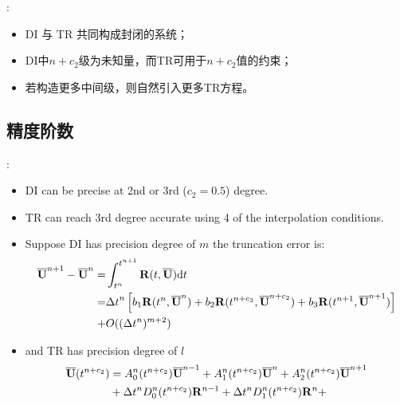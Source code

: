 \documentclass[aspectratio=169,serif]{beamer} %
\begin{document}
\begin{frame}[allowframebreaks]{\secname: \subsecname}
  \begin{itemize}
    \item DI  与 TR  共同构成封闭的系统；
    \item DI中$n+c_2$级为未知量，而TR可用于$n+c_2$值的约束；
    \item 若构造更多中间级，则自然引入更多TR方程。
  \end{itemize}
\end{frame}

\subsection{精度阶数}

\begin{frame}[allowframebreaks]{\secname: \subsecname}
  \begin{itemize}
    \item DI  can be precise at 2nd or 3rd ($c_2=0.5$) degree.
    \item TR can reach 3rd degree accurate using 4 of the interpolation conditions.
    \item Suppose DI has precision degree of $m$ the truncation error is:
          \begin{equation}
            \label{eq:Quad3Err}
            \begin{aligned}
              \overline{\mathbf{U}}^{n+1} - \overline{\mathbf{U}}^{n} = & \int_{t^n}^{t^{n+1}}{
              \mathbf{R}(t, \overline{\mathbf{U}})\dd t}                              \\  = &
              {{\Delta} t}^{n}
              \left[
                b_1\mathbf{R}(t^n, \overline{\mathbf{U}}^n)
                +
                b_2\mathbf{R}(t^{n+c_2}, \overline{\mathbf{U}}^{n+c_2})
                +
                b_3\mathbf{R}(t^{n+1}, \overline{\mathbf{U}}^{n+1})
                \right]
              \\ + &
              O(({\Delta} t^{n})^{m+2} )
            \end{aligned}
          \end{equation}
    \item and TR has precision degree of $l$
          \begin{equation}
            \begin{aligned}
              \label{eq:TRErr}
              \uu(t^{n+c_2}) & =
              A^n_0(t^{n+c_2})\uu^{n - 1} +
              A^n_1(t^{n+c_2})\uu^{n} +
              A^n_2(t^{n+c_2})\uu^{n + 1}
              \\ & +
              \inc t^n D^n_0(t^{n+c_2})\R^{n - 1} +
              \inc t^n D^n_1(t^{n+c_2})\R^{n} +

\end{aligned}
\end{equation}
\end{itemize}
\end{frame}
\end{document}
